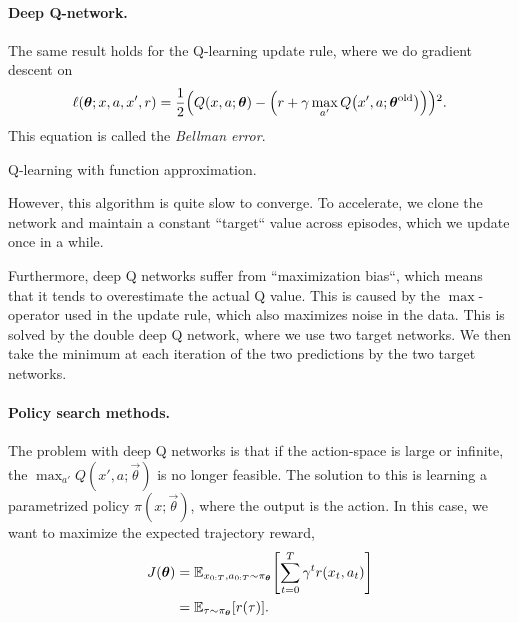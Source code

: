 \paragraph{Deep Q-network.}

The same result
holds for the Q-learning update rule, where we do gradient descent on \[
  \ell(\vec{\theta}; x,a,x',r) = \frac{1}{2} \lft( Q(x,a;\vec{\theta}) - \lft(r + \gamma \max_{a'} Q\lft(x',a; \vec{\theta}^{\mathrm{old}}\rgt) \rgt) \rgt)^2
.\]
This equation is called the \textit{Bellman error}.

\begin{algorithm}
  \begin{algorithmic}
      \EndWhile
    \EndFunction
  \end{algorithmic}
  \caption{Q-learning with function approximation.}
\end{algorithm}

However, this algorithm is quite slow to converge. To accelerate, we clone the
network and maintain a constant ``target`` value across episodes, which we
update once in a while.

Furthermore, deep Q networks suffer from ``maximization bias``, which means that
it tends to overestimate the actual Q value. This is caused by the
$\max$-operator used in the update rule, which also maximizes noise in the data.
This is solved by the double deep Q network, where we use two target networks.
We then take the minimum at each iteration of the two predictions by the two
target networks.

\paragraph{Policy search methods.}

The problem with deep Q networks is that if the action-space is large or
infinite, the $\max_{a'} Q(x',a;\vec{\theta})$ is no longer feasible. The
solution to this is learning a parametrized policy $\pi(x;\vec{\theta})$, where
the output is the action. In this case, we want to maximize the expected
trajectory reward,
\begin{align*}
  J(\vec{\theta}) &= \E_{x_{0:T},a_{0:T} \sim \pi_{\vec{\theta}}} \lft[ \sum_{t=0}^T \gamma^t r(x_t,a_t) \rgt] \\
                  &= \E_{\tau \sim \pi_{\vec{\theta}}} \lft[ r(\tau) \rgt]
.\end{align*}


